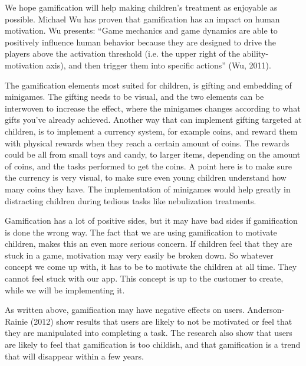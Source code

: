 We hope gamification will help making children's treatment as enjoyable as possible. Michael 
Wu has proven that gamification has an impact on human motivation. Wu presents: ``Game 
mechanics and game dynamics are able to positively influence human behavior 
because they are designed to drive the players above the activation threshold (i.e. the upper 
right of the ability-motivation axis), and then trigger them into specific actions'' (Wu, 2011)\cite{gamification101}.  

The gamification elements most suited for children, is gifting and embedding of minigames. The gifting needs to be visual, and
the two elements can be interwoven to increase the effect, where the minigames changes according to what gifts you've already
achieved. Another way that can implement gifting targeted at children, is to implement a currency system, for example coins, and reward them
with physical rewards when they reach a certain amount of coins. The rewards could be all from small toys and candy, to larger items, depending
on the amount of coins, and the tasks performed to get the coins. A point here is to make sure the currency is very visual, to make sure even
young children understand how many coins they have.
The implementation of minigames would help greatly in distracting children during tedious tasks like nebulization treatments.

Gamification has a lot of positive sides, but it may have bad sides if gamification is done the wrong way.
The fact that we are using gamification to motivate children, makes this an even more serious concern. If children feel that
they are stuck in a game, motivation may very easily be broken down. So whatever concept we come up with, it has to be 
to motivate the children at all time. They cannot feel stuck with our app. This concept is up to the customer to create, 
while we will be implementing it.  

As written above, gamification may have negative effects on users. Anderson-Rainie (2012)\cite{andersonrainie} show results
that users are likely to not be motivated or feel that they are manipulated into completing a task. The 
research also show that users are likely to feel that gamification is too childish, and that gamification 
is a trend that will disappear within a few years. 











